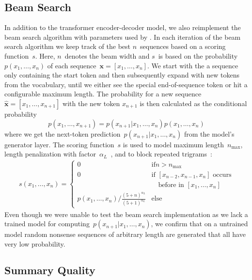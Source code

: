 \subsection{Beam Search}

In addition to the transformer encoder-decoder model, we also reimplement the beam search algorithm with parameters used by \citeauthor{LiuL2019}.
In each iteration of the beam search algorithm we keep track of the best \(n\)~sequences based on a scoring function~\(s\).
Here, \(n\)~denotes the beam width and \(s\)~is based on the probability~\(p(x_1,\ldots,x_n)\) of each sequence~\(\mathbf{x} = [x_1,\ldots,x_n]\).
We start with the a sequence only containing the start token and then subsequently expand with new tokens from the vocabulary, until we either see the special end-of-sequence token or hit a configurable maximum length.
The probability for a new sequence \(\mathbf{\hat x} = [x_1,\ldots,x_{n+1}]\) with the new token \(x_{n+1}\) is then calculated as the conditional probability
\[ p(x_1,\ldots,x_{n+1}) = p(x_{n+1}|x_1,\ldots,x_n)p(x_1,\ldots,x_n) \]
where we get the next-token prediction~\( p(x_{n+1}|x_1,\ldots,x_n) \) from the model's generator layer.
The scoring function~\(s\) is used to model maximum length~\(n_\text{max}\), length penalization with factor~\(\alpha_L\)~\cite{WuSCLNMKCGMKSJL2016}, and to block repeated trigrams~\cite{PaulusXS2018}:
\begin{align*}
    s(x_1,\ldots,x_n) = \begin{cases}
        0 & \text{if} n > n_\text{max} \\
        0 & \text{if \([x_{n-2},x_{n-1},x_n]\) occurs} \\
        & \quad\text{before in  \([x_1,\ldots,x_n]\)} \\
        p(x_1,\ldots,x_n) / \frac{(5 + n)^{\alpha_L}}{(5 + 1)^{\alpha_L}} & \text{else}
    \end{cases}
\end{align*}
Even though we were unable to test the beam search implementation as we lack a trained model for computing~\( p(x_{n+1}|x_1,\ldots,x_n) \), we confirm that on a untrained model random nonsense sequences of arbitrary length are generated that all have very low probability.

\subsection{Summary Quality}

